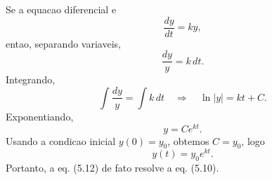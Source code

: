 Se a equacao diferencial e
\[
\frac{dy}{dt}=ky,
\]
entao, separando variaveis,
\[
\frac{dy}{y}=k\,dt.
\]
Integrando,
\[
\int \frac{dy}{y} = \int k\,dt
\quad\Rightarrow\quad
\ln|y| = kt + C.
\]
Exponentiando,
\[
y = Ce^{kt}.
\]
Usando a condicao inicial $y(0)=y_0$, obtemos $C=y_0$, logo
\[
y(t)=y_0e^{kt}.
\]
Portanto, a eq. (5.12) de fato resolve a eq. (5.10).

